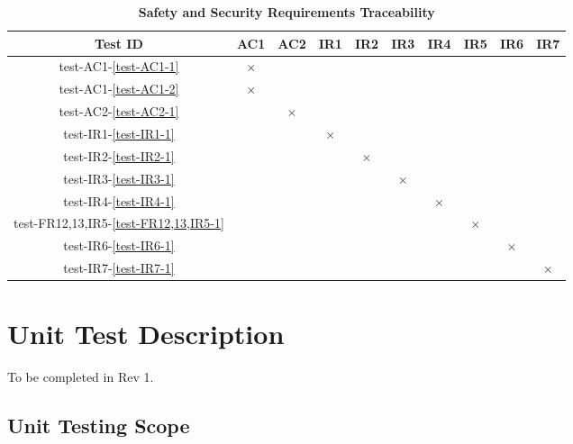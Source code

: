 \documentclass[12pt, titlepage]{article}
\begin{document}
\begin{landscape}
\begin{table} [H]
  \centering
  \begin{tabular}{|c|c|c|c|c|c|c|c|c|c|}
  \hline
  Test ID & AC1 & AC2 & IR1 & IR2 & IR3 & IR4 & IR5 & IR6 & IR7 \\
  \hline
  test-AC1-\ref{test-AC1-1} & $\times$ & & & & & & & & \\
  \hline
  test-AC1-\ref{test-AC1-2} & $\times$ & & & & & & & & \\
  \hline
  test-AC2-\ref{test-AC2-1} & & $\times$ & & & & & & & \\
  \hline
  test-IR1-\ref{test-IR1-1} & & & $\times$ & & & & & &  \\
  \hline
  test-IR2-\ref{test-IR2-1}  & & & & $\times$ & & & & & \\
  \hline
  test-IR3-\ref{test-IR3-1}  & & & & & $\times$ & & & & \\
  \hline
  test-IR4-\ref{test-IR4-1}  & & & & & & $\times$ & & & \\
  \hline
  test-FR12,13,IR5-\ref{test-FR12,13,IR5-1} & & & & & & & $\times$ & & \\
  \hline
  test-IR6-\ref{test-IR6-1}  & & & & & & & & $\times$ & \\
  \hline
  test-IR7-\ref{test-IR7-1}  & & & & & & & & & $\times$ \\
  \hline
\end{tabular}
\caption{\bf Safety and Security Requirements Traceability} \label{tab:sns-test-traceability}
\end{table}

\end{landscape}
\newpage


\section {Unit Test Description}

To be completed in Rev 1.

\subsection{Unit Testing Scope}

\end{document}
